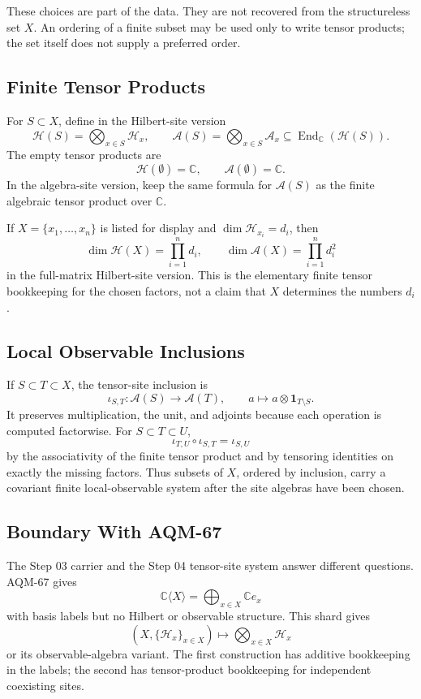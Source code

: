 These choices are part of the data.  They are not recovered from the
structureless set \(X\).  An ordering of a finite subset may be used only to
write tensor products; the set itself does not supply a preferred order.

\subsection{Finite Tensor Products}

For \(S\subset X\), define in the Hilbert-site version
\[
  \mathcal H(S)=\bigotimes_{x\in S}\mathcal H_x,\qquad
  \mathcal A(S)=\bigotimes_{x\in S}\mathcal A_x
  \subseteq \operatorname{End}_{\mathbb C}(\mathcal H(S)).
\]
The empty tensor products are
\[
  \mathcal H(\emptyset)=\mathbb C,\qquad
  \mathcal A(\emptyset)=\mathbb C.
\]
In the algebra-site version, keep the same formula for \(\mathcal A(S)\) as
the finite algebraic tensor product over \(\mathbb C\).

If \(X=\{x_1,\ldots,x_n\}\) is listed for display and
\(\dim\mathcal H_{x_i}=d_i\), then
\[
  \dim \mathcal H(X)=\prod_{i=1}^n d_i,
  \qquad
  \dim \mathcal A(X)=\prod_{i=1}^n d_i^2
\]
in the full-matrix Hilbert-site version.  This is the elementary finite tensor
bookkeeping for the chosen factors, not a claim that \(X\) determines the
numbers \(d_i\).

\subsection{Local Observable Inclusions}

If \(S\subset T\subset X\), the tensor-site inclusion is
\[
  \iota_{S,T}:\mathcal A(S)\longrightarrow \mathcal A(T),\qquad
  a\longmapsto a\otimes \mathbf 1_{T\setminus S}.
\]
It preserves multiplication, the unit, and adjoints because each operation is
computed factorwise.  For \(S\subset T\subset U\),
\[
  \iota_{T,U}\circ\iota_{S,T}=\iota_{S,U}
\]
by the associativity of the finite tensor product and by tensoring identities
on exactly the missing factors.  Thus subsets of \(X\), ordered by inclusion,
carry a covariant finite local-observable system after the site algebras have
been chosen.

\subsection{Boundary With AQM-67}

The Step 03 carrier and the Step 04 tensor-site system answer different
questions.  AQM-67 gives
\[
  \mathbb C\langle X\rangle=\bigoplus_{x\in X}\mathbb C e_x
\]
with basis labels but no Hilbert or observable structure.  This shard gives
\[
  (X,\{\mathcal H_x\}_{x\in X})
  \longmapsto
  \bigotimes_{x\in X}\mathcal H_x
\]
or its observable-algebra variant.  The first construction has additive
bookkeeping in the labels; the second has tensor-product bookkeeping for
independent coexisting sites.

